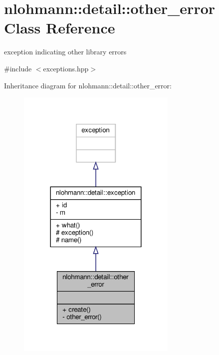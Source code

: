 \hypertarget{classnlohmann_1_1detail_1_1other__error}{}\section{nlohmann\+:\+:detail\+:\+:other\+\_\+error Class Reference}
\label{classnlohmann_1_1detail_1_1other__error}


exception indicating other library errors  




{\ttfamily \#include $<$exceptions.\+hpp$>$}



Inheritance diagram for nlohmann\+:\+:detail\+:\+:other\+\_\+error\+:
\nopagebreak
\begin{figure}[H]
\begin{center}
\leavevmode
\includegraphics[width=216pt]{classnlohmann_1_1detail_1_1other__error__inherit__graph}
\end{center}
\end{figure}


